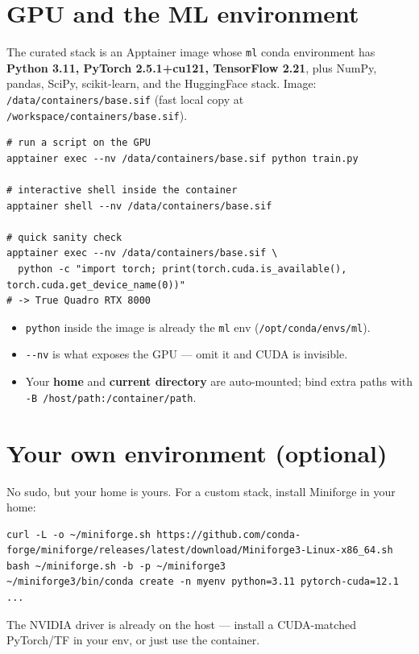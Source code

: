 \documentclass[11pt]{article}
\newcommand{\code}[1]{\texttt{#1}}
\begin{document}
\section{GPU and the ML environment}
The curated stack is an Apptainer image whose \code{ml} conda environment has \textbf{Python 3.11, PyTorch 2.5.1+cu121, TensorFlow 2.21}, plus NumPy, pandas, SciPy, scikit-learn, and the HuggingFace stack. Image: \code{/data/containers/base.sif} (fast local copy at \code{/workspace/containers/base.sif}).
\begin{lstlisting}
# run a script on the GPU
apptainer exec --nv /data/containers/base.sif python train.py

# interactive shell inside the container
apptainer shell --nv /data/containers/base.sif

# quick sanity check
apptainer exec --nv /data/containers/base.sif \
  python -c "import torch; print(torch.cuda.is_available(), torch.cuda.get_device_name(0))"
# -> True Quadro RTX 8000
\end{lstlisting}
\begin{itemize}
  \item \code{python} inside the image is already the \code{ml} env (\code{/opt/conda/envs/ml}).
  \item \code{-{}-nv} is what exposes the GPU --- omit it and CUDA is invisible.
  \item Your \textbf{home} and \textbf{current directory} are auto-mounted; bind extra paths with \code{-B /host/path:/container/path}.
\end{itemize}

\section{Your own environment (optional)}
No sudo, but your home is yours. For a custom stack, install Miniforge in your home:
\begin{lstlisting}
curl -L -o ~/miniforge.sh https://github.com/conda-forge/miniforge/releases/latest/download/Miniforge3-Linux-x86_64.sh
bash ~/miniforge.sh -b -p ~/miniforge3
~/miniforge3/bin/conda create -n myenv python=3.11 pytorch-cuda=12.1 ...
\end{lstlisting}
The NVIDIA driver is already on the host --- install a CUDA-matched PyTorch/TF in your env, or just use the container.
\end{document}
